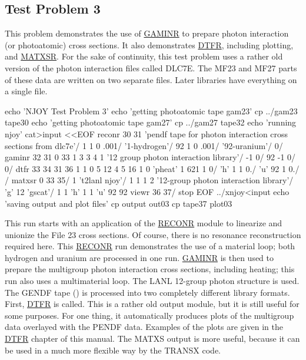 \subsection{Test Problem 3}
\label{ssMandT_3}

This problem demonstrates the use of
\hyperlink{sGAMINRhy}{GAMINR} to prepare
photon interaction (or photoatomic) cross sections.
It also demonstrates \hyperlink{sDTFRhy}{DTFR}, including plotting,
 and \hyperlink{sMATXSRhy}{MATXSR}.  For
the sake of continuity, this test problem uses a rather old version
of the photon interaction files called DLC7E.  The MF23
and MF27 parts of these data are written on two separate files.  Later
libraries have everything on a single file.

\small
\begin{ccode}

echo 'NJOY Test Problem 3'
echo 'getting photoatomic tape gam23'
cp ../gam23 tape30
echo 'getting photoatomic tape gam27'
cp ../gam27 tape32
echo 'running njoy'
cat>input <<EOF
 reconr
 30 31
 'pendf tape for photon interaction cross sections from dlc7e'/
 1 1 0
 .001/
 '1-hydrogen'/
 92 1 0
 .001/
 '92-uranium'/
 0/
 gaminr
 32 31 0 33
 1 3 3 4 1
 '12 group photon interaction library'/
 -1 0/
 92
 -1 0/
 0/
 dtfr
 33 34 31 36
 1 1 0
 5 12 4 5 16 1 0
 'pheat'
 1 621 1
 0/
 'h' 1 1 0./
 'u' 92 1 0./
 /
 matxsr
 0 33 35/
 1 't2lanl njoy'/
 1 1 1 2
 '12-group photon interaction library'/
 'g'
 12
 'gscat'/
 1
 1
 'h' 1 1
 'u' 92 92
 viewr
 36 37/
 stop
EOF
../xnjoy<input
echo 'saving output and plot files'
cp output out03
cp tape37 plot03

\end{ccode}

\normalsize

This run starts with an application of the
\hyperlink{sRECONRhy}{RECONR}
module to linearize and unionize the File 23 cross sections.  Of course,
there is no resonance reconstruction required here.  This
\hyperlink{sRECONRhy}{RECONR} run demonstrates the use
of a material loop; both hydrogen and uranium are processed
in one run.  \hyperlink{sGAMINRhy}{GAMINR} is then used
to prepare the multigroup photon interaction cross sections, including
heating; this run also uses a multimaterial loop.  The
LANL 12-group photon
structure is used.  The GENDF tape
() is processed into two completely different library
formats.  First, \hyperlink{sDTFRhy}{DTFR} is
called.  This is a rather old output module, but it is still useful
for some purposes.  For one thing,
it automatically produces plots of the multigroup data
overlayed with the PENDF data.  Examples of the plots are given in the
\hyperlink{sDTFRhy}{DTFR} chapter of this manual.  The MATXS
output is more useful, because it can be used in a much more
flexible way by the TRANSX code.

